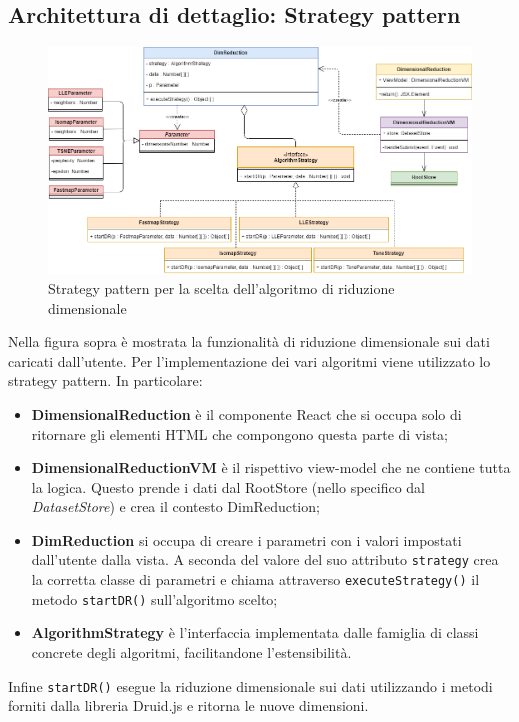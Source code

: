 \subsection{Architettura di dettaglio: Strategy pattern} 
\begin{figure}[hb]
	\includegraphics[width=17cm]{Images/StrategyPattern}
	\centering
	\caption{Strategy pattern per la scelta dell'algoritmo di riduzione dimensionale}
\end{figure}
Nella figura sopra è mostrata la funzionalità di riduzione dimensionale sui dati caricati dall'utente.
Per l'implementazione dei vari algoritmi viene utilizzato lo strategy pattern. In particolare:
\begin{itemize}
	\item \textbf{DimensionalReduction} è il componente React che si occupa solo di ritornare gli elementi HTML che compongono questa parte di vista;
	\item \textbf{DimensionalReductionVM} è il rispettivo view-model che ne contiene tutta la logica. Questo prende i dati dal RootStore (nello specifico dal \textit{DatasetStore}) e crea il contesto DimReduction;
	\item \textbf{DimReduction} si occupa di creare i parametri con i valori impostati dall'utente dalla vista. A seconda del valore del suo attributo \texttt{strategy} crea la corretta classe di parametri e chiama attraverso \texttt{executeStrategy()} il metodo \texttt{startDR()} sull'algoritmo scelto;
	\item \textbf{AlgorithmStrategy} è l'interfaccia implementata dalle famiglia di classi concrete degli algoritmi, facilitandone l'estensibilità.
\end{itemize} 

Infine \texttt{startDR()} esegue la riduzione dimensionale sui dati utilizzando i metodi forniti dalla libreria Druid.js e ritorna le nuove dimensioni.
